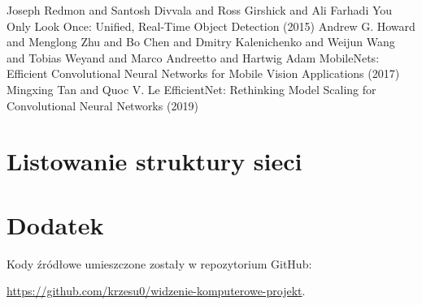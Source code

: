 \documentclass[10pt]{article}
\begin{document}
\begin{thebibliography}{9}
  Joseph Redmon and Santosh Divvala and Ross Girshick and Ali Farhadi
  You Only Look Once: Unified, Real-Time Object Detection (2015)
  Andrew G. Howard and Menglong Zhu and Bo Chen and Dmitry Kalenichenko and Weijun Wang and Tobias Weyand and Marco Andreetto and Hartwig Adam
  MobileNets: Efficient Convolutional Neural Networks for Mobile Vision Applications (2017) 
  Mingxing Tan and Quoc V. Le
  EfficientNet: Rethinking Model Scaling for Convolutional Neural Networks (2019)
\end{thebibliography}

\appendix

\section{Listowanie struktury sieci}
\label{app:listowanie}
\begin{center}
  
\end{center}

\section{Dodatek}
Kody źródłowe umieszczone zostały w repozytorium GitHub:

\noindent \url{https://github.com/krzesu0/widzenie-komputerowe-projekt}.
\end{document}
